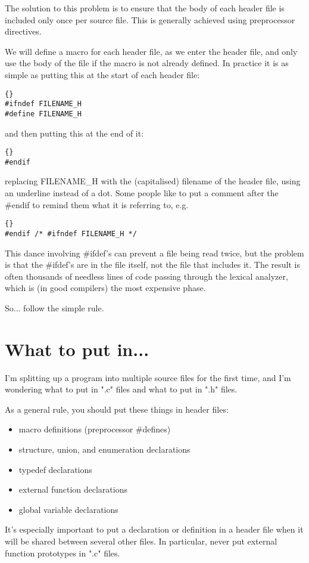 \documentclass{report}
\begin{document}
The solution to this problem is to ensure that the body of each header file is included only once per source file. This is generally achieved using preprocessor directives.

We will define a macro for each header file, as we enter the header file, and only use the body of the file if the macro is not already defined. In practice it is as simple as putting this at the start of each header file: 
\begin{lstlisting}{}
#ifndef FILENAME_H
#define FILENAME_H
\end{lstlisting}
and then putting this at the end of it: 
\begin{lstlisting}{}
#endif 
\end{lstlisting}
replacing FILENAME\_H with the (capitalised) filename of the header file, using an underline instead of a dot. Some people like to put a comment after the \#endif to remind them what it is referring to, e.g. 
\begin{lstlisting}{}
#endif /* #ifndef FILENAME_H */ 
\end{lstlisting}
This dance involving \#ifdef's can prevent a file being read twice, but the problem is that the \#ifdef's are in the file itself, not the file that includes it. The result is often thousands of needless lines of code passing through the lexical analyzer, which is (in good compilers) the most expensive phase.
 
So... follow the simple rule. 


\section{What to put in...}
I'm splitting up a program into multiple source files for the first time, and I'm wondering what to put in ".c" files and what to put in ".h" files.

As a general rule, you should put these things in header files:
\begin{itemize}
\item macro definitions (preprocessor \#defines)
\item structure, union, and enumeration declarations
\item typedef declarations
\item external function declarations
\item global variable declarations
\end{itemize}
It's especially important to put a declaration or definition in a header file when it will be shared between several other files. In particular, never put external function prototypes in ".c" files.
\end{document}

